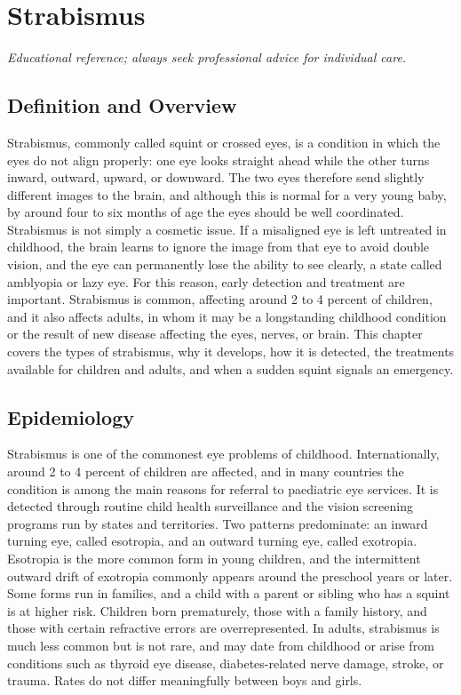 \chapter{Strabismus}

\medskip
\noindent\textit{Educational reference; always seek professional advice for individual care.}

\section*{Definition and Overview}
Strabismus, commonly called squint or crossed eyes, is a condition in which the eyes do not align properly: one eye looks straight ahead while the other turns inward, outward, upward, or downward. The two eyes therefore send slightly different images to the brain, and although this is normal for a very young baby, by around four to six months of age the eyes should be well coordinated. Strabismus is not simply a cosmetic issue. If a misaligned eye is left untreated in childhood, the brain learns to ignore the image from that eye to avoid double vision, and the eye can permanently lose the ability to see clearly, a state called amblyopia or lazy eye. For this reason, early detection and treatment are important. Strabismus is common, affecting around 2 to 4 percent of children, and it also affects adults, in whom it may be a longstanding childhood condition or the result of new disease affecting the eyes, nerves, or brain. This chapter covers the types of strabismus, why it develops, how it is detected, the treatments available for children and adults, and when a sudden squint signals an emergency.

\section*{Epidemiology}
Strabismus is one of the commonest eye problems of childhood. Internationally, around 2 to 4 percent of children are affected, and in many countries the condition is among the main reasons for referral to paediatric eye services. It is detected through routine child health surveillance and the vision screening programs run by states and territories. Two patterns predominate: an inward turning eye, called esotropia, and an outward turning eye, called exotropia. Esotropia is the more common form in young children, and the intermittent outward drift of exotropia commonly appears around the preschool years or later. Some forms run in families, and a child with a parent or sibling who has a squint is at higher risk. Children born prematurely, those with a family history, and those with certain refractive errors are overrepresented. In adults, strabismus is much less common but is not rare, and may date from childhood or arise from conditions such as thyroid eye disease, diabetes-related nerve damage, stroke, or trauma. Rates do not differ meaningfully between boys and girls.

